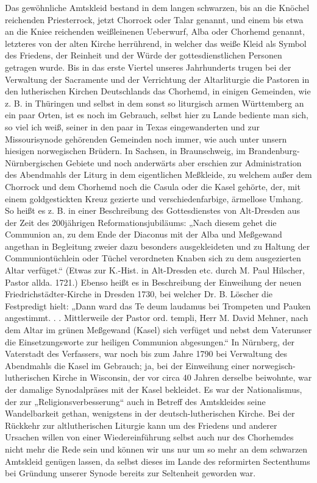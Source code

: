 Das gewöhnliche Amtskleid bestand in dem langen schwarzen, bis an die Knöchel reichenden Priesterrock, jetzt Chorrock oder Talar genannt, und einem bis etwa an die Kniee reichenden weißleinenen Ueberwurf, Alba oder Chorhemd genannt, letzteres von der alten Kirche herrührend, in welcher das weiße Kleid als Symbol des Friedens, der Reinheit und der Würde der gottesdienstlichen Personen getragen wurde. Bis in das erste Viertel unseres Jahrhunderts trugen bei der Verwaltung der Sacramente und der Verrichtung der Altarliturgie die Pastoren in den lutherischen Kirchen Deutschlands das Chorhemd, in einigen Gemeinden, wie z. B. in Thüringen und selbst in dem sonst so liturgisch armen Württemberg an ein paar Orten, ist es noch im Gebrauch, selbst hier zu Lande bediente man sich, so viel ich weiß, seiner in den paar in Texas eingewanderten und zur Missourisynode gehörenden Gemeinden noch immer, wie auch unter unsern hiesigen norwegischen Brüdern. In Sachsen, in Braunschweig, im Brandenburg-Nürnbergischen Gebiete und noch anderwärts aber erschien zur Administration des Abendmahls der Liturg in dem eigentlichen Meßkleide, zu welchem außer dem Chorrock und dem Chorhemd noch die Casula oder die Kasel gehörte, der, mit einem goldgestickten Kreuz gezierte und verschiedenfarbige, ärmellose Umhang. So heißt es z. B. in einer Beschreibung des Gottesdienstes von Alt-Dresden aus der Zeit des 200jährigen Reformationsjubiläums: „Nach diesem gehet die Communion an, zu dem Ende der Diaconus mit der Alba und Meßgewand angethan in Begleitung zweier dazu besonders ausgekleideten und zu Haltung der Communiontüchlein oder Tüchel verordneten Knaben sich zu dem ausgezierten Altar verfüget.“ (Etwas zur K.-Hist. in Alt-Dresden etc. durch M. Paul Hilscher, Pastor allda. 1721.) Ebenso heißt es in Beschreibung der Einweihung der neuen Friedrichstädter-Kirche in Dresden 1730, bei welcher Dr. B. Löscher die Festpredigt hielt: „Dann ward das Te deum laudamus bei Trompeten und Pauken angestimmt. . . Mittlerweile der Pastor ord. templi, Herr M. David Mehner, nach dem Altar im grünen Meßgewand (Kasel) sich verfüget und nebst dem Vaterunser die Einsetzungsworte zur heiligen Communion abgesungen.“ In Nürnberg, der Vaterstadt des Verfassers, war noch bis zum Jahre 1790 bei Verwaltung des Abendmahls die Kasel im Gebrauch; ja, bei der Einweihung einer norwegisch-lutherischen Kirche in Wisconsin, der vor circa 40 Jahren derselbe beiwohnte, war der damalige Synodalpräses mit der Kasel bekleidet. Es war der Nationalismus, der zur „Religionsverbesserung“ auch in Betreff des Amtskleides seine Wandelbarkeit gethan, wenigstens in der deutsch-lutherischen Kirche. Bei der Rückkehr zur altlutherischen Liturgie
kann um des Friedens und anderer Ursachen willen von einer Wiedereinführung selbst auch nur des Chorhemdes nicht mehr die Rede sein und können wir uns nur um so mehr an dem schwarzen Amtskleid genügen lassen, da selbst dieses im Lande des reformirten Sectenthums bei Gründung unserer Synode bereits zur Seltenheit geworden war.

